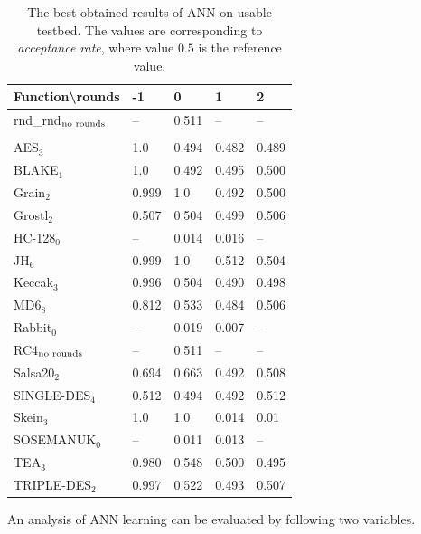 \documentclass[
  print, %
  Table,   %
  nolof,     %
  nolot,     %
  11pt, %
  oneside  %
]{fithesis3}
\newcommand{\fd}{\cellcolor{red!13}}
\newcommand{\fn}{\cellcolor{green!13}}
\begin{document}
\begin{table}[H]
\centering
\begin{tabular}{l|l l l l}
Function\textbackslash{}rounds & -1 & 0 & 1 & 2\\ \hline
rnd\_rnd$_{\textnormal{no rounds}}$& -- & \fn{}0.511 & --         & --         \\\\
AES$_{3}$        & \fd{}1.0   & \fn{}0.494 & \fn{}0.482 & \fn{}0.489 \\
BLAKE$_{1}$      & \fd{}1.0   & \fn{}0.492 & \fn{}0.495 & \fn{}0.500 \\
Grain$_{2}$      & \fd{}0.999 & \fd{}1.0   & \fn{}0.492 & \fn{}0.500 \\
Grostl$_{2}$     & \fn{}0.507 & \fn{}0.504 & \fn{}0.499 & \fn{}0.506 \\
HC-128$_{0}$     & \fd{}--    & \fn{}0.014 & \fn{}0.016 & \fn{}--    \\
JH$_{6}$         & \fd{}0.999 & \fd{}1.0   & \fn{}0.512 & \fn{}0.504 \\
Keccak$_{3}$     & \fd{}0.996 & \fn{}0.504 & \fn{}0.490 & \fn{}0.498 \\
MD6$_{8}$        & \fd{}0.812 & \fd{}0.533 & \fn{}0.484 & \fn{}0.506 \\
Rabbit$_{0}$     & \fd{}--    & \fn{}0.019 & \fn{}0.007 & \fn{}--    \\
RC4$_{\textnormal{no rounds}}$& --         & \fn{}0.511 & --         & --         \\
Salsa20$_{2}$    & \fd{}0.694 & \fd{}0.663 & \fn{}0.492 & \fn{}0.508 \\
SINGLE-DES$_{4}$ & \fd{}0.512 & \fn{}0.494 & \fn{}0.492 & \fn{}0.512 \\
Skein$_{3}$      & \fd{}1.0   & \fd{}1.0   & \fn{}0.014 & \fn{}0.01  \\
SOSEMANUK$_{0}$  & \fd{}--    & \fn{}0.011 & \fn{}0.013 & \fn{}--    \\
TEA$_{3}$        & \fd{}0.980 & \fd{}0.548 & \fn{}0.500 & \fn{}0.495 \\
TRIPLE-DES$_{2}$ & \fd{}0.997 & \fd{}0.522 & \fn{}0.493 & \fn{}0.507
\end{tabular}
\caption{The best obtained results of ANN on usable testbed. The values are corresponding to \textit{acceptance rate}, where value $0.5$ is the reference value.}
\label{table:res-usable-ann}
\end{table}

An analysis of ANN learning can be evaluated by following two variables.
\end{document}
